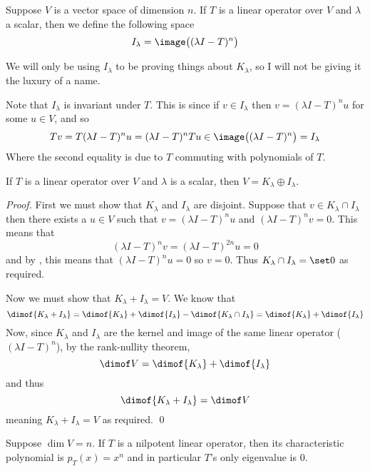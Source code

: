 \begin{defn*}

    Suppose $V$ is a vector space of dimension $n$.
    If $T$ is a linear operator over $V$ and $\lambda$ a scalar, then we define the following space
    \[ I_\lambda = \image\bigl((\lambda I-T)^n\bigr) \]

\end{defn*}

We will only be using $I_\lambda$ to be proving things about $K_\lambda$, so I will not be giving it the luxury of a name.

Note that $I_\lambda$ is invariant under $T$.
This is since if $v\in I_\lambda$ then $v=(\lambda I-T)^nu$ for some $u\in V$, and so
\[ Tv = T(\lambda I-T)^nu = (\lambda I-T)^nTu \in \image\bigl((\lambda I-T)^n\bigr) = I_\lambda \]
Where the second equality is due to $T$ commuting with polynomials of $T$.

\begin{prop*}

    If $T$ is a linear operator over $V$ and $\lambda$ is a scalar, then $V=K_\lambda\oplus I_\lambda$.

\end{prop*}

\begin{proof}

    First we must show that $K_\lambda$ and $I_\lambda$ are disjoint.
    Suppose that $v\in K_\lambda\cap I_\lambda$ then there exists a $u\in V$ such that $v=(\lambda I-T)^nu$ and $(\lambda I-T)^nv=0$.
    This means that
    \[ (\lambda I-T)^nv = (\lambda I-T)^{2n}u = 0 \]
    and by , this means that $(\lambda I-T)^nu=0$ so $v=0$.
    Thus $K_\lambda\cap I_\lambda=\set0$ as required.

    Now we must show that $K_\lambda+I_\lambda = V$.
    We know that
    \[ \dimof{K_\lambda + I_\lambda} = \dimof{K_\lambda} + \dimof{I_\lambda} - \dimof{K_\lambda\cap I_\lambda} = \dimof{K_\lambda} + \dimof{I_\lambda} \]
    Now, since $K_\lambda$ and $I_\lambda$ are the kernel and image of the same linear operator ($(\lambda I-T)^n$), by the rank-nullity theorem,
    \[ \dimof V = \dimof{K_\lambda} + \dimof{I_\lambda} \]
    and thus
    \[ \dimof{K_\lambda + I_\lambda} = \dimof V \]
    meaning $K_\lambda+I_\lambda=V$ as required.
    \qed

\end{proof}

\begin{lemm*}

    Suppose $\dim V=n$.
    If $T$ is a nilpotent linear operator, then its characteristic polynomial is $p_T(x)=x^n$ and in particular $T$'s only eigenvalue is $0$.

\end{lemm*}

